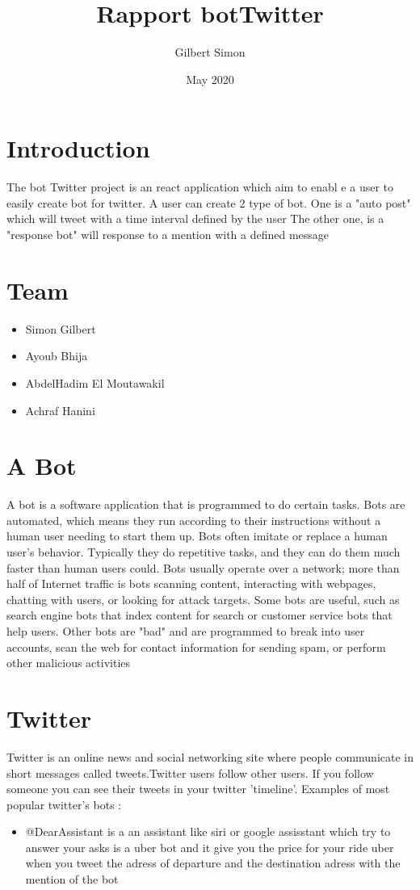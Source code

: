 \documentclass{article}
\title{Rapport botTwitter}
\author{Gilbert Simon }
\date{May 2020}
\begin{document}
\maketitle

\section{Introduction}
The bot Twitter project is an react application which aim to enabl
e a user to easily create bot for twitter.
A user can create 2 type of bot. One is a "auto post" which will 
tweet with a time interval defined by the user
The other one, is a "response bot" will response to a mention with a defined message


\section{Team}
\begin{itemize}
    \item Simon Gilbert
    \item Ayoub Bhija
    \item AbdelHadim El Moutawakil
    \item Achraf Hanini
\end{itemize}

\section{A Bot}
A bot is a software application that is programmed to do certain tasks. Bots are automated, which means they run according to their instructions without a human user needing to start them up. Bots often imitate or replace a human user's behavior. Typically they do repetitive tasks, and they can do them much faster than human users could.
Bots usually operate over a network; more than half of Internet traffic is bots scanning content, interacting with webpages, chatting with users, or looking for attack targets. Some bots are useful, such as search engine bots that index content for search or customer service bots that help users. Other bots are "bad" and are programmed to break into user accounts, scan the web for contact information for sending spam, or perform other malicious activities

\section{Twitter}
Twitter is an online news and social networking site where people communicate in short messages called tweets.Twitter users follow other users. If you follow someone you can see their tweets in your twitter 'timeline'. 
Examples of most popular twitter's bots :
\begin{itemize}
\item@HundredZeros  is a Twitterbot that regularly tweets links to the eBooks that are free on Amazon
\item @DearAssistant is a an assistant like siri or google assisstant which try to answer your asks
\item@WhatTheFare is a uber bot and it give you the price for your ride uber when you tweet the adress of departure and the destination adress with the mention of the bot
\end{itemize}
\end{document}
